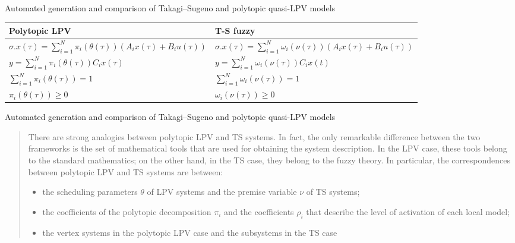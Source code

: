 \begin{frame}{Automated generation and comparison of Takagi–Sugeno and polytopic quasi-LPV models}
\begin{table}[htb]
    \centering
    \renewcommand{\arraystretch}{1.5}
    \begin{tabularx}{\textwidth}{
    |>{\centering\arraybackslash}X 
    |>{\centering\arraybackslash}X | }
    \hline Polytopic LPV & T-S fuzzy\\ \hline \hline
    $\sigma.x(\tau) = \displaystyle  \sum_{i=1}^{N}\pi_i(\theta(\tau))(A_ix(\tau)+B_iu(\tau))$ & $\sigma.x(\tau) = \displaystyle  \sum_{i=1}^{N}\omega_i(\nu(\tau))(A_ix(\tau)+B_iu(\tau))$\\
    $y= \displaystyle \sum_{i=1}^{N}\pi_i(\theta(\tau))C_ix(\tau)$ &
    $ y= \displaystyle  \sum_{i=1}^{N}\omega_i(\nu(\tau))C_ix(t)$ \\
    $\displaystyle\sum_{i=1}^{N}\pi_i(\theta(\tau)) = 1$ &
    $\displaystyle\sum_{i=1}^{N}\omega_i(\nu(\tau)) = 1$ \\
    $\displaystyle \pi_i(\theta(\tau)) \geq 0$ &
    $\displaystyle \omega_i(\nu(\tau)) \geq 0$ \\
    \hline
    \end{tabularx}
    \label{tab:comp}
\end{table}
\end{frame}

\begin{frame}{Automated generation and comparison of Takagi–Sugeno and polytopic quasi-LPV models}
\blockquote{There are strong analogies between polytopic LPV and TS systems. In fact, the only remarkable difference between
the two frameworks is the set of mathematical tools that are used for obtaining the system description. In the LPV case, these tools belong to the standard mathematics; on the other hand, in the TS case, they belong to the fuzzy theory. In particular, the correspondences between polytopic LPV and TS systems are between:
\begin{itemize}
    \item the scheduling parameters $\theta$ of LPV systems and the premise variable $\nu$ of TS systems; 
    \item the coefficients of the polytopic decomposition $\pi_i$ and the coefficients $\rho_i$ that describe the level of activation of each local model;
\item the vertex systems in the polytopic LPV case and the subsystems in the TS case
\end{itemize}}


\end{frame}


